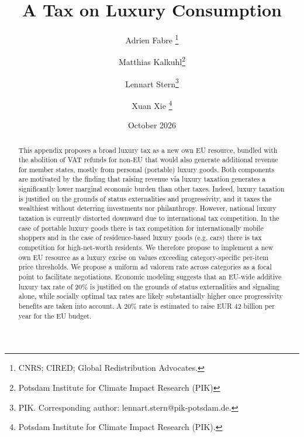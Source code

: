 \documentclass{article}
\title{A Tax on Luxury Consumption} %
\author{Adrien Fabre \thanks{CNRS; CIRED; Global Redistribution Advocates.} \and Matthias Kalkuhl\thanks{Potsdam Institute for Climate Impact Research (PIK)} \and Lennart Stern\thanks{PIK. Corresponding author: lennart.stern@pik-potsdam.de.} \and Xuan Xie  \thanks{Potsdam Institute for Climate Impact Research (PIK).}}
\date{October 2026}
\begin{document}
\maketitle

\begin{abstract}
This appendix proposes a broad luxury tax as a new own EU resource, bundled with the abolition of VAT refunds for non-EU  that would also generate additional revenue for member states, mostly from personal (portable) luxury goods. %
Both components are motivated by the finding that raising revenue via luxury taxation generates a significantly lower marginal economic burden than other taxes.
Indeed, luxury taxation is justified on the grounds of status externalities and progressivity, and it taxes the wealthiest without deterring investments nor philanthropy. However, national luxury taxation is currently distorted downward due to international tax competition. In the case of portable luxury goods there is tax competition for internationally mobile shoppers and in the case of residence-based luxury goods (e.g. cars) there is tax competition for high-net-worth residents.
We therefore propose to implement a new own EU resource as a luxury excise on values exceeding category-specific per-item price thresholds. 
We propose a uniform ad valorem rate across categories as a focal point to facilitate negotiations. Economic modeling suggests that an EU-wide additive luxury tax rate of 20\% is justified on the grounds of status externalities and signaling alone, while socially optimal tax rates are likely substantially higher once progressivity benefits are taken into account. A 20\% rate is estimated to raise EUR $42$ billion per year for the EU budget. 

\end{abstract}
\end{document}
